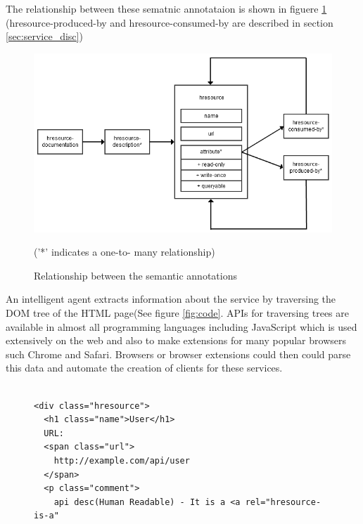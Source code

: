 \begin{spacing}{1.5}
The relationship between these sematnic annotataion is shown in figuere \ref{fig:rel_semantic} (hresource-produced-by and hresource-consumed-by are described in section \ref{sec:service_disc})
\begin{figure}
        \centering
        \includegraphics[scale=0.5]{images/rel_semantic.png}
        \caption{Relationship between the semantic annotations}
 ('*' indicates a one-to- many relationship)
        \label{fig:rel_semantic}
\end{figure}


An intelligent agent extracts information about the service by traversing the DOM tree of the HTML page(See figure \ref{fig:code}. APIs for traversing trees are available in almost all programming languages including JavaScript which is used extensively on the web and also to make extensions for many popular browsers such Chrome and Safari. Browsers or browser extensions could then could parse this data and automate the creation of clients for these services.

\begin{figure}
\begin{verbatim}

<div class="hresource">
  <h1 class="name">User</h1>
  URL:
  <span class="url">
    http://example.com/api/user
  </span>
  <p class="comment">
    api desc(Human Readable) - It is a <a rel="hresource-is-a"


\end{verbatim}
\end{figure}
\end{spacing}
